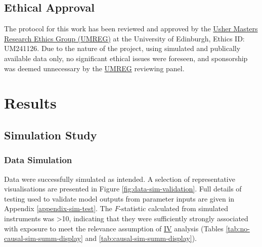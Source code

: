 \documentclass[
]{article}
\begin{document}
\subsection{Ethical Approval}\label{ethical-approval}

The protocol for this work has been reviewed and approved by the \hyperref[acronyms_UMREG]{Usher Masters Research Ethics Group (UMREG)} at the University of Edinburgh, Ethics ID: UM241126. Due to the nature of the project, using simulated and publically available data only, no significant ethical issues were foreseen, and sponsorship was deemed unnecessary by the \hyperref[acronyms_UMREG]{UMREG} reviewing panel.

\section{Results}\label{results-1}

\subsection{Simulation Study}\label{simulation-study-1}

\subsubsection{Data Simulation}\label{data-simulation-1}

Data were successfully simulated as intended. A selection of representative visualisations are presented in Figure \ref{fig:data-sim-validation}. Full details of testing used to validate model outputs from parameter inputs are given in Appendix \ref{appendix-sim-test}. The \(F\)-statistic calculated from simulated instruments was \textgreater10, indicating that they were sufficiently strongly associated with exposure to meet the relevance assumption of \hyperref[acronyms_IV]{IV} analysis (Tables \ref{tab:no-causal-sim-summ-display} and \ref{tab:causal-sim-summ-display}).
\end{document}
